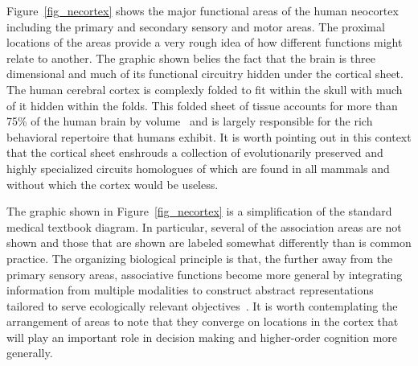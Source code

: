 \documentclass[letterpaper,11pt]{article}
\def\urlh#1{{}}
\begin{document}

Figure~{\urlh{#fig_Human_Brain_Neocortex_Function}{\ref{fig_necortex}}} shows the major functional areas of the human neocortex including the primary and secondary sensory and motor areas. The proximal locations of the areas provide a very rough idea of how different functions might relate to another. The graphic shown belies the fact that the brain is three dimensional and much of its functional circuitry hidden under the cortical sheet. The human cerebral cortex is complexly folded to fit within the skull with much of it hidden within the folds. This folded sheet of tissue accounts for more than 75\% of the human brain by volume~\cite{SwansonTiN-95} and is largely responsible for the rich behavioral repertoire that humans exhibit. It is worth pointing out in this context that the cortical sheet enshrouds a collection of evolutionarily preserved and highly specialized circuits homologues of which are found in all mammals and without which the cortex would be useless.

The graphic shown in Figure~{\urlh{#fig_Human_Brain_Neocortex_Function}{\ref{fig_necortex}}} is a simplification of the standard medical textbook diagram. In particular, several of the association areas are not shown and those that are shown are labeled somewhat differently than is common practice. The organizing biological principle is that, the further away from the primary sensory areas, associative functions become more general by integrating information from multiple modalities to construct abstract representations tailored to serve ecologically relevant objectives~\cite{Higher_Cortical_Functions_Association}. It is worth contemplating the arrangement of areas to note that they converge on locations in the cortex that will play an important role in decision making and higher-order cognition more generally.

\end{document}
